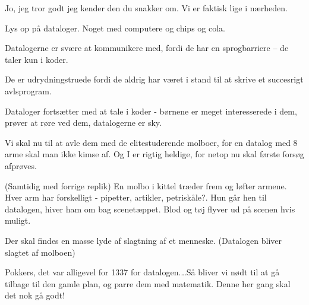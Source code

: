 \documentclass[a4paper,12pt]{article}
\begin{document}
\begin{sketch}
Jo, jeg tror godt jeg kender den du snakker om. Vi er faktisk lige i nærheden.

\scene Lys op på dataloger. Noget med computere og chips og cola.

Datalogerne er svære at kommunikere med, fordi de har en sprogbarriere -- de taler kun i koder.

De er udrydningstruede fordi de aldrig har været i stand til at skrive et succesrigt avlsprogram. %

\scene Dataloger fortsætter med at tale i koder - børnene er meget interesserede i dem, prøver at røre ved dem, datalogerne er sky.

Vi skal nu til at avle dem med de elitestuderende molboer, for en datalog med 8 arme skal man ikke kimse af. Og I er rigtig heldige, for netop nu skal første forsøg afprøves.

\scene (Samtidig med forrige replik) En molbo i kittel træder frem og løfter armene. Hver arm har forskelligt - pipetter, artikler, petriskåle?. Hun går hen til datalogen, hiver ham om bag scenetæppet. Blod og tøj flyver ud på scenen hvis muligt.

\scene Der skal findes en masse lyde af slagtning af et menneske. (Datalogen bliver slagtet af molboen)

  Pokkers, det var alligevel for 1337 for datalogen.\dots Så bliver vi nødt til at gå tilbage til den gamle plan, og parre dem med matematik. Denne her gang skal det nok gå godt!

\end{sketch}
\end{document}
